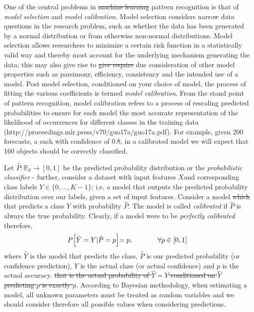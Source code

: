 \documentclass[10pt]{article}[draft]
\begin{document}
One of the central problems in \st{machine learning} pattern recognition is that of \emph{model selection} and \emph{model calibration}. Model selection considers narrow data questions in the research  problem, such as whether the data has been generated by a normal distribution or from otherwise non-normal distributions. Model selection allows researchers to minimize a certain risk function in a statistically valid way and thereby most account for the underlying mechanism generating the data; this may also give rise to \st{give require} due consideration of other model properties such as parsimony, efficiency, consistency and the intended use of a model.  Post model selection, conditioned on your choice of model, the process of fitting the various coefficients is termed \emph{model calibration}. From the stand point of pattern recognition, model calibration refers to a process of  rescaling predicted probabilities to ensure for each model the most accurate representation of the likelihood of occurrences for different classes in the training data (http://proceedings.mlr.press/v70/guo17a/guo17a.pdf). For example, given 200 forecasts, a each with confidence of 0.8, in a calibrated model we will expect that 160 objects should be correctly classified.  

Let \(\hat{P} : \mathbb{R}_d \rightarrow [0, 1]\) be the predicted probability distribution or the \emph{probabilistic classifier} - further,  consider a dataset with input features \(X\)and corresponding class labels \(Y \in \{0, ... , K-1 \}\); i.e. a model that outputs the predicted probability distribution over our labels, given a set of input features. Consider a model \st{which} that predicts a class \(Y\) with probability \(\hat{P}\). The model is called \emph{calibrated} if \(\hat{P}\) is always the true probability. Clearly, if a model were to be  \emph{perfectly calibrated} therefore,
\begin{equation}
	P \Bigr[ \hat{Y} = Y | \hat{P}  = p \Bigl] = p, \hspace{0.5in} \forall p \in [0,1]
	\label{basic}
\end{equation}
where \(\hat{Y}\) is the model that predicts the class, \(\hat{P}\) is our predicted probability (or confidence prediction), ${Y}$ is the actual class (or actual confidence) and $p$ is the actual accuracy. \st{that is the actual probability of $\hat{Y} = Y$ conditioned on $\hat{Y}$ predicting $p$ is exactly $p$}.  According to Bayesian methodology, when estimating a model, all unknown parameters must be treated as random variables and we should consider therefore all possible values when considering predictions. 
\end{document}
